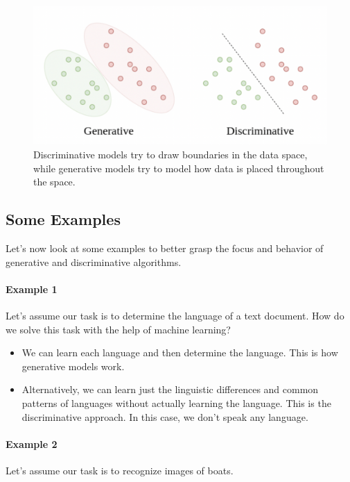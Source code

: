 \begin{figure}[h]
    \centering
    \includegraphics[scale=0.75]{images/gen-discr-models/gen-vs-discr-visual.png}
    \caption{Discriminative models try to draw boundaries in the data space, while generative models try to model how data is placed throughout the space.}
    \label{fig:gen_vs_discr_visual}
\end{figure}

\subsection{Some Examples}

Let's now look at some examples to better grasp the focus and behavior of generative and discriminative algorithms.

\paragraph{Example 1} Let’s assume our task is to determine the language of a text document. How do we solve this task with the help of machine learning?

\begin{itemize}
    \item We can learn each language and then determine the language. This is how generative models work.

    \item Alternatively, we can learn just the linguistic differences and common patterns of languages without actually learning the language. This is the discriminative approach. In this case, we don’t speak any language.
\end{itemize}

\paragraph{Example 2} Let's assume our task is to recognize images of boats.

